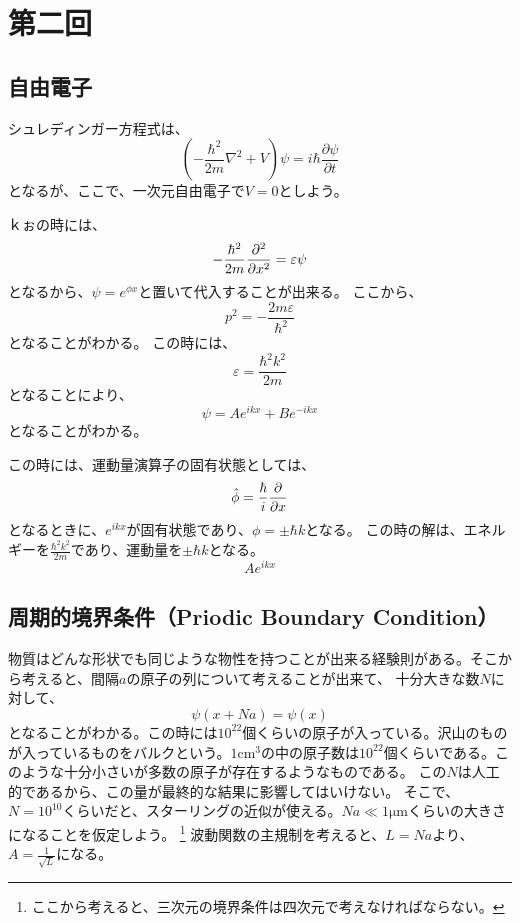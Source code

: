 \documentclass[titlepage]{ltjsarticle}
\begin{document}
\section{第二回}
\subsection{自由電子}
シュレディンガー方程式は、
\begin{equation}
    \left( -\frac{\hbar^2}{2m} \nabla^2 + V \right) \psi = i\hbar \frac{\partial \psi}{\partial t}
\end{equation}
となるが、ここで、一次元自由電子で\(V=0\)としよう。

ｋぉの時には、
\begin{equation}
    - \frac{\hbar^2}{2m} \pdv[order=2]{}{x} = \varepsilon \psi 
\end{equation}
となるから、\(\psi = e^{\phi x}\)と置いて代入することが出来る。
ここから、
\begin{equation}
  p^2 = - \frac{2m \varepsilon}{\hbar^2}
\end{equation}
となることがわかる。
この時には、
\begin{equation}
  \varepsilon = \frac{\hbar^2 k^2}{2m}
\end{equation}
となることにより、
\begin{equation}
  \psi = A e^{ikx} + B e^{-ikx}
\end{equation}
となることがわかる。

この時には、運動量演算子の固有状態としては、
\begin{equation}
  \hat{\phi} = \frac{\hbar}{i} \pdv{}{x}
\end{equation}
となるときに、\(e^{ikx}\)が固有状態であり、\(\phi=\pm \hbar k\)となる。
この時の解は、エネルギーを\(\frac{\hbar^2 k^2}{2m}\)であり、運動量を\(\pm \hbar k\)となる。
\begin{equation}
  Ae^{ikx} 
\end{equation}

\subsection{周期的境界条件（Priodic Boundary Condition）}
物質はどんな形状でも同じような物性を持つことが出来る経験則がある。そこから考えると、間隔\(a\)の原子の列について考えることが出来て、
十分大きな数\(N \)に対して、
\begin{equation}
  \psi(x+Na) = \psi(x)  
\end{equation}
となることがわかる。この時には\(10^{22}\)個くらいの原子が入っている。沢山のものが入っているものをバルクという。\(1 \mathrm{cm^3}\)の中の原子数は\(10^{22}\)個くらいである。このような十分小さいが多数の原子が存在するようなものである。
この\(N\)は人工的であるから、この量が最終的な結果に影響してはいけない。
そこで、\(N=10^{10}\)くらいだと、スターリングの近似が使える。\(Na\ll 1\mathrm{\mu m}\)くらいの大きさになることを仮定しよう。
\footnote{ここから考えると、三次元の境界条件は四次元で考えなければならない。}
波動関数の主規制を考えると、\(L=Na\)より、\(A= \frac{1}{\sqrt{L}}\)になる。
\end{document}
